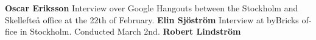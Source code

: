 \foreignlanguage{swedish}{
\textbf{Oscar Eriksson} Interview over Google Hangouts between the Stockholm and Skellefteå office at the 22th of February.
\textbf{Elin Sjöström} Interview at byBricks office in Stockholm. Conducted March 2nd.
\textbf{Robert Lindström}}
